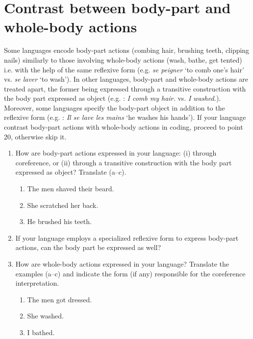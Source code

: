 \documentclass[output=paper]{langscibook}
\begin{document}
\section*{Contrast between body-part and whole-body actions}

Some languages encode body-part actions (combing hair, brushing teeth, clipping nails) similarly to those involving whole-body actions (wash, bathe, get tented) i.e. with the help of the same reflexive form (e.g.  \textit{se peigner} ‘to comb one’s hair’ vs. \textit{se laver} ‘to wash’). In other languages, body-part and whole-body actions are treated apart, the former being expressed through a transitive construction with the body part expressed as object (e.g. : \textit{I comb my hair.} vs. \textit{I washed.}). Moreover, some languages specify the body-part object in addition to the reflexive form (e.g. : \textit{Il se lave les mains} ‘he washes his hands’). If your language contrast body-part actions with whole-body actions in coding, proceed to point 20, otherwise skip it.


\begin{enumerate}[resume]
\item How are body-part actions expressed in your language: (i) through coreference, or (ii) through a transitive construction with the body part expressed as object? Translate (a--c). 

\begin{enumerate}[label=\alph*.]
\item  The men shaved their beard. 
\item  She scratched her back. 
\item  He brushed his teeth. 
\end{enumerate}

\item If your language employs a specialized reflexive form to express body-part actions, can the body part be expressed as well? 

\item How are whole-body actions expressed in your language? Translate the examples (a--c) and indicate the form (if any) responsible for the coreference interpretation. 

\begin{enumerate}[label=\alph*.]
\item The men got dressed.
\item She washed. 
\item I bathed. 
\end{enumerate}

\end{enumerate}
\end{document}
